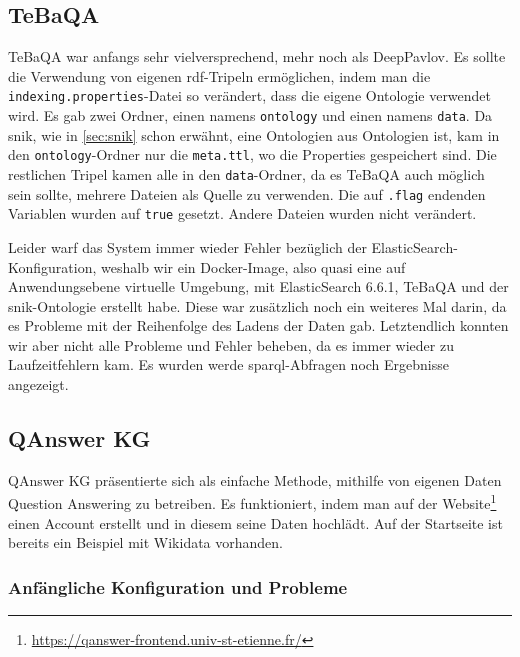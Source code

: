 \subsection{TeBaQA}

TeBaQA war anfangs sehr vielversprechend, mehr noch als DeepPavlov.
Es sollte die Verwendung von eigenen \ac{rdf}-Tripeln ermöglichen, indem man die \texttt{indexing.properties}-Datei so verändert, dass die eigene Ontologie verwendet wird.
Es gab zwei Ordner, einen namens \texttt{ontology} und einen namens \texttt{data}.
Da \ac{snik}, wie in \cref{sec:snik} schon erwähnt, eine Ontologien aus Ontologien ist, kam in den \texttt{ontology}-Ordner nur die \texttt{meta.ttl}, wo die Properties gespeichert sind.
Die restlichen Tripel kamen alle in den \texttt{data}-Ordner, da es TeBaQA auch möglich sein sollte, mehrere Dateien als Quelle zu verwenden.
Die auf \texttt{.flag} endenden Variablen wurden auf \texttt{true} gesetzt.
Andere Dateien wurden nicht verändert.

Leider warf das System immer wieder Fehler bezüglich der ElasticSearch-Konfiguration, weshalb wir ein Docker-Image,
also quasi eine auf Anwendungsebene virtuelle Umgebung, mit ElasticSearch 6.6.1, TeBaQA und der \ac{snik}-Ontologie erstellt habe.
Diese war zusätzlich noch ein weiteres Mal darin, da es Probleme mit der Reihenfolge des Ladens der Daten gab.
Letztendlich konnten wir aber nicht alle Probleme und Fehler beheben, da es immer wieder zu Laufzeitfehlern kam.
Es wurden werde \ac{sparql}-Abfragen noch Ergebnisse angezeigt.

\subsection{QAnswer KG}

QAnswer KG präsentierte sich als einfache Methode, mithilfe von eigenen Daten Question Answering zu betreiben.
Es funktioniert, indem man auf der Website\footnote{\url{https://qanswer-frontend.univ-st-etienne.fr/}} einen Account erstellt und in diesem seine Daten hochlädt.
Auf der Startseite ist bereits ein Beispiel mit Wikidata vorhanden.

\subsubsection{Anfängliche Konfiguration und Probleme}

